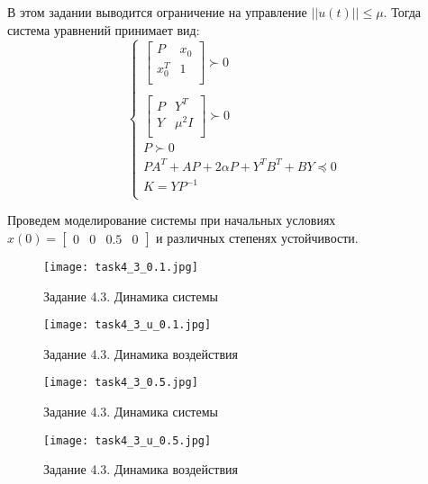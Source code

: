 В этом задании выводится ограничение на управление \(||u(t)|| \leq \mu\). Тогда система уравнений принимает вид: 
\[
        \begin{cases}
                \begin{bmatrix}
                    P &  x_0\\
                    x_0^T &  1 \\
                \end{bmatrix} \succ 0 \\
                \\
                \begin{bmatrix}
                    P &  Y^T\\
                    Y &  \mu^2I \\
                \end{bmatrix} \succ 0 \\
                P \succ 0 \\
                PA^T + AP + 2 \alpha P + Y^T B^T + BY \preccurlyeq 0  \\
                K = YP^{-1}\\
        \end{cases} 
\]

Проведем моделирование системы при начальных условиях $x(0)=\begin{bmatrix} 0 & 0 & 0.5 & 0 \end{bmatrix}$ и различных степенях устойчивости.
\begin{figure}[]
    \centering
    \texttt{[image: task4\_3\_0.1.jpg]}
    \caption{Задание 4.3. Динамика системы}
    \label{fig:task4_3_0.1}
\end{figure}
\begin{figure}[]
    \centering
    \texttt{[image: task4\_3\_u\_0.1.jpg]}
    \caption{Задание 4.3. Динамика воздействия}
    \label{fig:task4_3_u_0.1}
\end{figure}

\begin{figure}[]
    \centering
    \texttt{[image: task4\_3\_0.5.jpg]}
    \caption{Задание 4.3. Динамика системы}
    \label{fig:task4_3_0.5}
\end{figure}
\begin{figure}[]
    \centering
    \texttt{[image: task4\_3\_u\_0.5.jpg]}
    \caption{Задание 4.3. Динамика воздействия}
    \label{fig:task4_3_u_0.5}
\end{figure}

